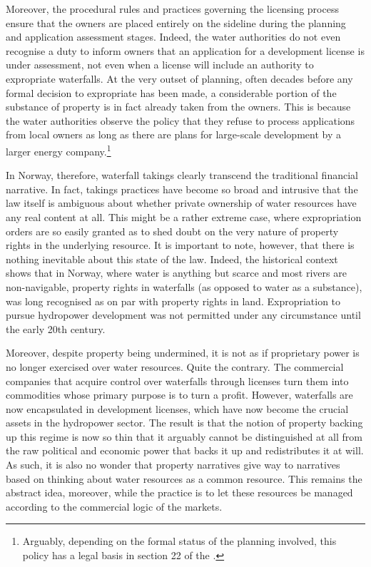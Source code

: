 Moreover, the procedural rules and practices governing the licensing process ensure that the owners are placed entirely on the sideline during the planning and application assessment stages. Indeed, the water authorities do not even recognise a duty to inform owners that an application for a development license is under assessment, not even when a license will include an authority to expropriate waterfalls. At the very outset of planning, often decades before any formal decision to expropriate has been made, a considerable portion of the substance of property is in fact already taken from the owners. This is because the water authorities observe the policy that they refuse to process applications from local owners as long as there are plans for large-scale development by a larger energy company.\footnote{Arguably, depending on the formal status of the planning involved, this policy has a legal basis in section 22 of the \cite{wra00}.} 

In Norway, therefore, waterfall takings clearly transcend the traditional financial narrative. In fact, takings practices have become so broad and intrusive that the law itself is ambiguous about whether private ownership of water resources have any real content at all. This might be a rather extreme case, where expropriation orders are so easily granted as to shed doubt on the very nature of property rights in the underlying resource. It is important to note, however, that there is nothing inevitable about this state of the law. Indeed, the historical context shows that in Norway, where water is anything but scarce and most rivers are non-navigable, property rights in waterfalls (as opposed to water as a substance), was long recognised as on par with property rights in land. Expropriation to pursue hydropower development was not permitted under any circumstance until the early 20th century. 

Moreover, despite property being undermined, it is not as if proprietary power is no longer exercised over water resources. Quite the contrary. The commercial companies that acquire control over waterfalls through licenses turn them into commodities whose primary purpose is to turn a profit. However, waterfalls are now encapsulated in development licenses, which have now become the crucial assets in the hydropower sector. The result is that the notion of property backing up this regime is now so thin that it arguably cannot be distinguished at all from the raw political and economic power that backs it up and redistributes it at will. As such, it is also no wonder that property narratives give way to narratives based on thinking about water resources as a common resource. This remains the abstract idea, moreover, while the practice is to let these resources be managed according to the commercial logic of the markets.

